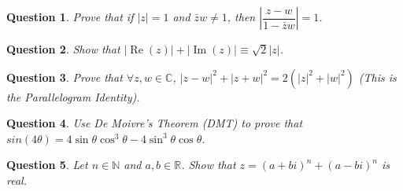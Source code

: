 \documentclass[11pt,oneside]{article}
\newtheorem{question}{Question}
\begin{document}
\bigskip

\begin{question}
	Prove that if $|z| = 1$ and $\bar{z}w \neq 1$, then $\left | \dfrac{z - w}{1 - \bar{z}w} \right | = 1$.
\end{question}

\bigskip

\begin{question}
	Show that $|\operatorname{Re}(z)| + |\operatorname{Im}(z)| \equiv \sqrt{2}|z|$.
\end{question}

\bigskip

\begin{question}
	Prove that $\forall z, w \in \mathbb{C}$, $|z - w|^2 + |z + w|^2 = 2(|z|^2 + |w|^2)$ (This is the Parallelogram Identity).
\end{question}

\bigskip

\begin{question}
	Use De Moivre's Theorem (DMT) to prove that $sin(4\theta) = 4\sin\theta\cos^3\theta - 4\sin^3\theta\cos \theta$.
\end{question}

\bigskip

\begin{question}
	Let $n \in \mathbb{N}$ and $a, b \in \mathbb{R}$. Show that $z = (a + bi)^n + (a - bi)^n$ is real.
\end{question}
\end{document}

